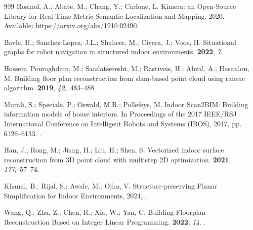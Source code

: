 \documentclass[10pt,a4paper]{article}
\begin{document}
\begin{thebibliography}{999}
Rosinol, A.; Abate, M.; Chang, Y.; Carlone, L.
\newblock Kimera: an Open-Source Library for Real-Time Metric-Semantic
  Localization and Mapping,  2020.
\newblock Available: https://arxiv.org/abs/1910.02490.

Bavle, H.; Sanchez-Lopez, J.L.; Shaheer, M.; Civera, J.; Voos, H.
\newblock Situational graphs for robot navigation in structured indoor
  environments.
 {\bf 2022}, {\em 7}.

Hossein~Pouraghdam, M.; Saadatseresht, M.; Rastiveis, H.; Abzal, A.; Hasanlou,
  M.
\newblock Building floor plan reconstruction from slam-based point cloud using
  ransac algorithm.
 {\bf 2019}, {\em 42},~483--488.

Murali, S.; Speciale, P.; Oswald, M.R.; Pollefeys, M.
\newblock Indoor Scan2BIM: Building information models of house interiors.
\newblock In Proceedings of the 2017 IEEE/RSJ International Conference on
  Intelligent Robots and Systems (IROS),  2017, pp. 6126--6133.
.

Han, J.; Rong, M.; Jiang, H.; Liu, H.; Shen, S.
\newblock Vectorized indoor surface reconstruction from 3D point cloud with
  multistep 2D optimization.
 {\bf 2021},
  {\em 177},~57--74.

Khanal, B.; Rijal, S.; Awale, M.; Ojha, V.
\newblock Structure-preserving Planar Simplification for Indoor Environments,
  2024,  \href{http://arxiv.org/abs/2408.06814}{{\normalfont
  [arXiv:cs.CV/2408.06814]}}.

Wang, Q.; Zhu, Z.; Chen, R.; Xia, W.; Yan, C.
\newblock Building Floorplan Reconstruction Based on Integer Linear
  Programming.
 {\bf 2022}, {\em 14}.
.


\end{thebibliography}
\end{document}
